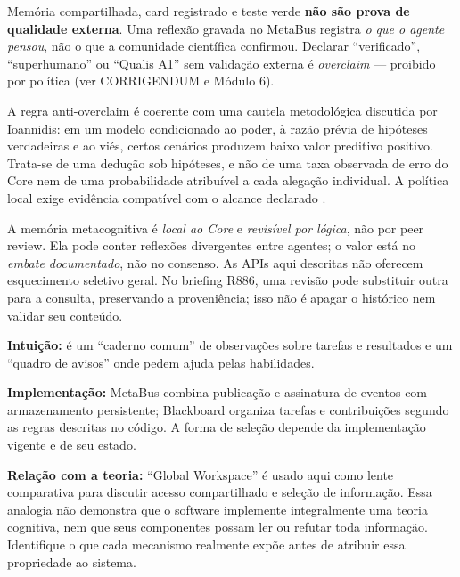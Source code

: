 \begin{aviso}
Memória compartilhada, card registrado e teste verde \textbf{não são prova de
qualidade externa}. Uma reflexão gravada no MetaBus registra \emph{o que o
agente pensou}, não o que a comunidade científica confirmou. Declarar
“verificado”, “superhumano” ou “Qualis A1” sem validação externa é
\emph{overclaim} — proibido por política (ver CORRIGENDUM e Módulo 6).
\end{aviso}

\par\smallskip
A regra anti-overclaim é coerente com uma cautela metodológica discutida por
Ioannidis: em um modelo condicionado ao poder, à razão prévia de hipóteses
verdadeiras e ao viés, certos cenários produzem baixo valor preditivo positivo.
Trata-se de uma dedução sob hipóteses, e não de uma taxa observada de erro do
Core nem de uma probabilidade atribuível a cada alegação individual. A
política local exige evidência compatível com o alcance declarado
.
\begin{limite}
A memória metacognitiva é \emph{local ao Core} e \emph{revisível por lógica},
não por peer review. Ela pode conter reflexões divergentes entre agentes; o
valor está no \emph{embate documentado}, não no consenso. As APIs aqui descritas
não oferecem esquecimento seletivo geral. No briefing R886, uma revisão pode
substituir outra para a consulta, preservando a proveniência; isso não é
apagar o histórico nem validar seu conteúdo.
\end{limite}

\begin{niveis}
\textbf{Intuição:} é um “caderno comum” de observações sobre tarefas e resultados e
um “quadro de avisos” onde pedem ajuda pelas habilidades.\par\smallskip
\textbf{Implementação:} MetaBus combina publicação e assinatura de eventos com
armazenamento persistente; Blackboard organiza tarefas e contribuições segundo
as regras descritas no código. A forma de seleção depende da implementação
vigente e de seu estado.\par\smallskip
\textbf{Relação com a teoria:} ``Global Workspace'' é usado aqui como lente
comparativa para discutir acesso compartilhado e seleção de informação. Essa
analogia não demonstra que o software implemente integralmente uma teoria
cognitiva, nem que seus componentes possam ler ou refutar toda informação.
Identifique o que cada mecanismo realmente expõe antes de atribuir essa
propriedade ao sistema.
\end{niveis}

